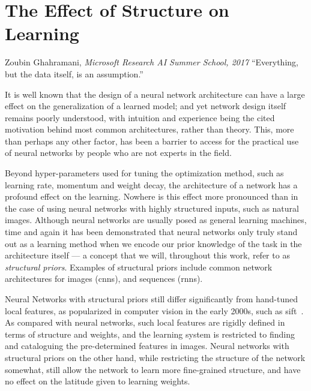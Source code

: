 \documentclass[thesis]{subfiles}
\begin{document}
	\chapter{The Effect of Structure on Learning}\label{motivation}
	\begin{chapquote}{Zoubin Ghahramani, \textit{Microsoft Research AI Summer School, 2017}}
		``Everything, but the data itself, is an assumption.''
	\end{chapquote}
	It is well known that the design of a neural network architecture can have a large effect on the generalization of a learned model; and yet network design itself remains poorly understood, with intuition and experience being the cited motivation behind most common architectures, rather than theory. This, more than perhaps any other factor, has been a barrier to access for the practical use of neural networks by people who are not experts in the field.
	
	Beyond hyper-parameters used for tuning the optimization method, such as learning rate, momentum and weight decay, the architecture of a network has a profound effect on the learning. Nowhere is this effect more pronounced than in the case of using neural networks with highly structured inputs, such as natural images. Although neural networks are usually posed as general learning machines, time and again it has been demonstrated that neural networks only truly stand out as a learning method when we encode our prior knowledge of the task in the architecture itself --- a concept that we will, throughout this work, refer to as \emph{structural priors}. Examples of structural priors include common network architectures for images (\glspl{cnn}), and sequences (\glspl{rnn}).
	
	Neural Networks with structural priors still differ significantly from hand-tuned local features, as popularized in computer vision in the early 2000s, such as \gls{sift}~\citep{Lowe2004}. As compared with neural networks, such local features are rigidly defined in terms of structure and weights, and the learning system is restricted to finding and cataloguing the pre-determined features in images. Neural networks with structural priors on the other hand, while restricting the structure of the network somewhat, still allow the network to learn more fine-grained structure, and have no effect on the latitude given to learning weights.
	
\end{document}
